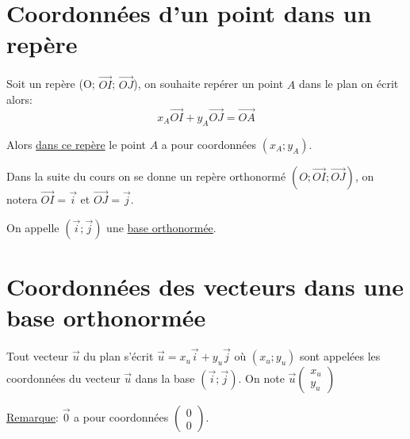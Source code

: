 \documentclass[french]{book}
\begin{document}
\section{Coordonnées d’un point dans un repère}
\begin{defn}
Soit un repère (O;  $\overrightarrow{OI}$; $\overrightarrow{OJ}$), on souhaite repérer un point $A$ dans le plan on écrit alors: 
$$x_A \overrightarrow{OI} +y_A \overrightarrow{OJ}=\overrightarrow{OA}$$

Alors \underline{dans ce repère} le point $A$ a pour coordonnées $(x_A;y_A)$.\\
\end{defn}

Dans la suite du cours on se donne un repère orthonormé $ (O; \overrightarrow{OI}; \overrightarrow{OJ} )$, on notera $\overrightarrow{OI}=\overrightarrow{i}$ et $\overrightarrow{OJ}=\overrightarrow{j}$.

On appelle $(\overrightarrow{i};\overrightarrow{j})$ une \underline{base orthonormée}.

\section{Coordonnées des vecteurs dans une base orthonormée}

\begin{prop}

Tout vecteur $\overrightarrow{u}$ du plan  s’écrit  $\overrightarrow{u}=x_u \overrightarrow{i} + y_u \overrightarrow{j}$  où $(x_u;y_u)$ sont appelées les coordonnées du vecteur $\overrightarrow{u}$ dans la base $(\overrightarrow{i};\overrightarrow{j})$. On note $\overrightarrow{u} \left( \begin{array}{c}
x_u \\
y_u 
\end{array} \right)
$

\end{prop}

\underline{Remarque}: $\overrightarrow{0}$ a pour coordonnées $\left( \begin{array}{c}
0 \\
0 
\end{array} \right)$.
\end{document}
